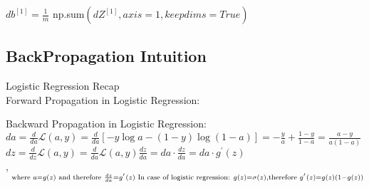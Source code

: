 \documentclass{article}
\begin{document}
$db^{[1]} = \frac{1}{m}$ np.sum$(dZ^{[1]}, axis=1, keepdims=True)$\\


\newpage
\subsection{BackPropagation Intuition}

Logistic Regression Recap\\

Forward Propagation in Logistic Regression:\\


Backward Propagation in Logistic Regression:\\

$da = \frac{d}{da}\mathcal{L}(a,y) = \frac{d}{da}[-y\log{a} -(1-y)\log(1-a)]=-\frac{y}{a} +\frac{1-y}{1-a} = \frac{a-y}{a(1-a)}$\\

$dz = \frac{d}{dz}\mathcal{L}(a,y) = \frac{d}{da}\mathcal{L}(a,y) \frac{dz}{da}= da \cdot \frac{dz}{da} = da \cdot g^{'}(z)$\\

,$\hspace{2mm} _{\text{where} \hspace{1mm} a=g(z) \hspace{1mm}\text{and therefore\hspace{1mm}} \frac{dz}{da} = g^{'}(z) \hspace{1mm} \text{In case of logistic regression: } g(z) = \sigma(z), \text{therefore } g^{'}(z) = g(z)(1-g(z))}$\\
\end{document}
